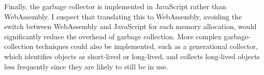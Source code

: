 Finally, the garbage collector is implemented in JavaScript rather than WebAssembly. I suspect that translating this to WebAssembly, avoiding the switch between WebAssembly and JavaScript for each memory allocation, would significantly reduce the overhead of garbage collection. More complex garbage-collection techniques could also be implemented, such as a generational collector, which identifies objects as short-lived or long-lived, and collects long-lived objects less frequently since they are likely to still be in use.



